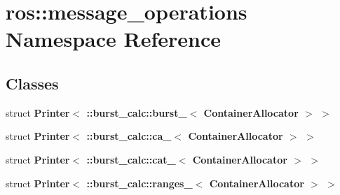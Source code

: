 \section{ros\-:\-:message\-\_\-operations \-Namespace \-Reference}
\label{namespaceros_1_1message__operations}
\subsection*{\-Classes}
\begin{DoxyCompactItemize}
\item 
struct {\bf \-Printer$<$ \-::burst\-\_\-calc\-::burst\-\_\-$<$ Container\-Allocator $>$ $>$}
\item 
struct {\bf \-Printer$<$ \-::burst\-\_\-calc\-::ca\-\_\-$<$ Container\-Allocator $>$ $>$}
\item 
struct {\bf \-Printer$<$ \-::burst\-\_\-calc\-::cat\-\_\-$<$ Container\-Allocator $>$ $>$}
\item 
struct {\bf \-Printer$<$ \-::burst\-\_\-calc\-::ranges\-\_\-$<$ Container\-Allocator $>$ $>$}
\end{DoxyCompactItemize}
